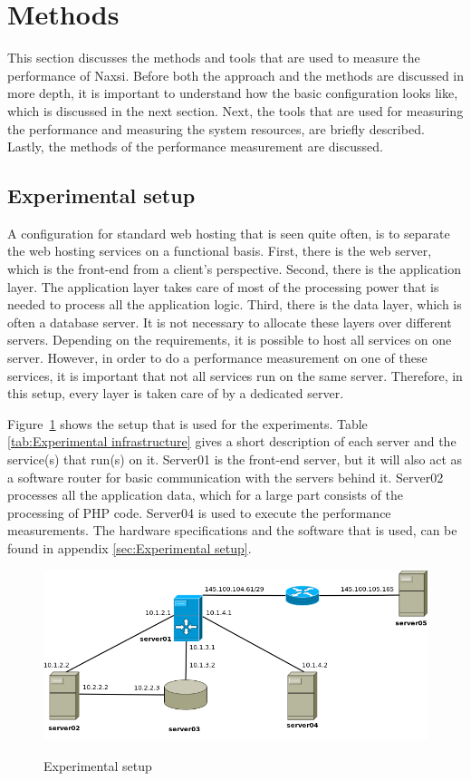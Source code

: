 \documentclass[Methods]{subfiles}
\begin{document}
\section{Methods}
\label{sec:Methods}

This section discusses the methods and tools that are used to measure the performance of Naxsi. Before both the approach and the methods are discussed in more depth, it is important to understand how the basic configuration looks like, which is discussed in the next section. Next, the tools that are used for measuring the performance and measuring the system resources, are briefly described. Lastly, the methods of the performance measurement are discussed.

\subsection{Experimental setup}
A configuration for standard web hosting that is seen quite often, is to separate the web hosting services on a functional basis. First, there is the web server, which is the front-end from a client's perspective. Second, there is the application layer. The application layer takes care of most of the processing power that is needed to process all the application logic. Third, there is the data layer, which is often a database server. It is not necessary to allocate these layers over different servers. Depending on the requirements, it is possible to host all services on one server. However, in order to do a performance measurement on one of these services, it is important that not all services run on the same server. Therefore, in this setup, every layer is taken care of by a dedicated server.

Figure~\ref{fig:Experimental setup} shows the setup that is used for the experiments. Table \ref{tab:Experimental infrastructure} gives a short description of each server and the service(s) that run(s) on it. Server01 is the front-end server, but it will also act as a software router for basic communication with the servers behind it. Server02 processes all the application data, which for a large part consists of the processing of PHP code. Server04 is used to execute the performance measurements. The hardware specifications and the software that is used, can be found in appendix \ref{sec:Experimental setup}.

\begin{figure}[H]
\caption{Experimental setup}
\centering
\includegraphics[scale=0.4] {images/infrastructure.png}
\label{fig:Experimental setup}
\end{figure}
\end{document}
